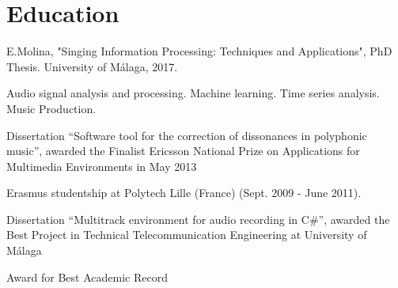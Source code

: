 \documentclass[]{deedy-resume-openfont}
\begin{document}
\begin{minipage}[t]{0.66\textwidth}
\section{Education}
\begin{tightemize}
\item E.Molina, "Singing Information Processing: Techniques and Applications", PhD Thesis. University of Málaga, 2017.
\end{tightemize}
\begin{tightemize}
\item Audio signal analysis and processing. Machine learning. Time series analysis. Music Production. 
\end{tightemize}
\begin{tightemize}
\item Dissertation
``Software tool for the correction of dissonances in polyphonic music'', awarded
the Finalist Ericsson National Prize on Applications for Multimedia Environments in May 2013
\item Erasmus studentship at Polytech Lille (France) (Sept. 2009 - June 2011).
\end{tightemize}
\begin{tightemize}
\item Dissertation
``Multitrack environment for audio recording in C\#'', awarded the Best Project in Technical Telecommunication Engineering at University of Málaga
\item Award for Best Academic Record
\end{tightemize}

\sectionsep

\sectionsep


\end{minipage} 
\end{document}
